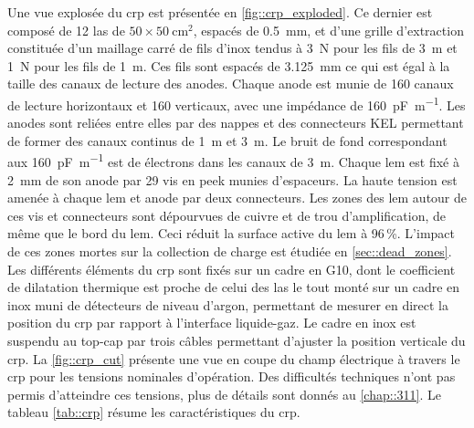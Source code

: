       Une vue explosée du \gls{crp} est présentée en \autoref{fig::crp_exploded}. Ce dernier est composé de 12 \gls{las} de $50\times\SI{50}{\centi\meter\squared}$,  espacés de \SI{0.5}{\milli\meter}, et d'une grille d'extraction constituée d'un maillage carré de fils d'inox tendus à \SI{3}{\newton} pour les fils de \SI{3}{\meter} et \SI{1}{\newton} pour les fils de \SI{1}{\meter}. Ces fils sont espacés de \SI{3.125}{\milli\meter} ce qui est égal à la taille des canaux de lecture des anodes. Chaque anode est munie de 160 canaux de lecture horizontaux et 160 verticaux, avec une impédance de \SI{160}{\pico\farad\per\meter}. Les anodes sont reliées entre elles par des nappes et des connecteurs KEL permettant de former des canaux continus de \SI{1}{\meter} et \SI{3}{\meter}. Le bruit de fond correspondant aux \SI{160}{\pico\farad\per\meter} est de  électrons dans les canaux de \SI{3}{\meter}\cite{Aimard2018}. Chaque \gls{lem} est fixé à \SI{2}{\milli\meter} de son anode par 29 vis en \gls{peek} munies d'espaceurs. La haute tension est amenée à chaque \gls{lem} et anode par deux connecteurs. Les zones des \gls{lem} autour de ces vis et connecteurs sont dépourvues de cuivre et de trou d'amplification, de même que le bord du \gls{lem}. Ceci réduit la surface active du \gls{lem} à 96\,\%. L'impact de ces zones mortes sur la collection de charge est étudiée en \autoref{sec::dead_zones}. Les différents éléments du \gls{crp} sont fixés sur un cadre en G10, dont le coefficient de dilatation thermique est proche de celui des \gls{las} le tout monté sur un cadre en inox muni de détecteurs de niveau d'argon, permettant de mesurer en direct la position du \gls{crp} par rapport à l'interface liquide-gaz. Le cadre en inox est suspendu au top-cap par trois câbles permettant d'ajuster la position verticale du \gls{crp}. La \autoref{fig::crp_cut} présente une vue en coupe du champ électrique à travers le \gls{crp} pour les tensions nominales d'opération. Des difficultés techniques n'ont pas permis d'atteindre ces tensions, plus de détails sont donnés au \autoref{chap::311}. Le tableau \autoref{tab::crp} résume les caractéristiques du \gls{crp}.

